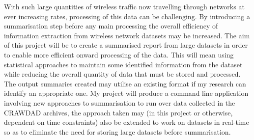 With such large quantities of wireless traffic now travelling through networks at ever increasing rates, processing of this data can be challenging. By introducing a summarisation step before any main processing the overall efficiency of information extraction from wireless network datasets may be increased. The aim of this project will be to create a summarised report from large datasets in order to enable more efficient onward processing of the data. This will mean using statistical approaches to maintain some identified information from the dataset while reducing the overall quantity of data that must be stored and processed. The output summaries created may utilise an existing format if my research can identify an appropriate one. My project will produce a command line application involving new approaches to summarisation to run over data collected in the CRAWDAD archives, the approach taken may (in this project or otherwise, dependent on time constraints) also be extended to work on datasets in real-time so as to eliminate the need for storing large datasets before summarisation.
